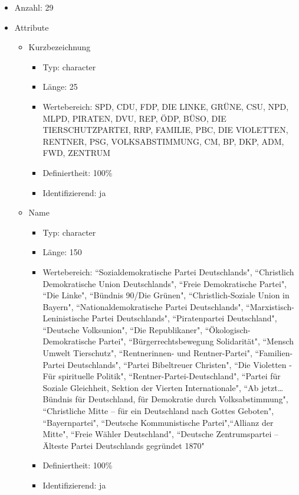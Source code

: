 \documentclass[a4paper]{article}
\begin{document}
\begin{itemize}
\item Anzahl: 29
\item Attribute
	\begin{itemize}
	\item Kurzbezeichnung
	\begin{itemize}
		\item Typ: character
		\item Länge: 25
		\item Wertebereich: SPD, CDU, FDP, DIE LINKE, GRÜNE, CSU, NPD, MLPD, PIRATEN, DVU, REP, ÖDP, BÜSO, DIE TIERSCHUTZPARTEI, RRP, FAMILIE, PBC, DIE VIOLETTEN, RENTNER, PSG, VOLKSABSTIMMUNG, CM, BP, DKP, ADM, FWD, ZENTRUM
		\item Definiertheit: 100\%
		\item Identifizierend: ja
	\end{itemize}
	\item Name
	\begin{itemize}
		\item Typ: character
		\item Länge: 150
		\item Wertebereich: ``Sozialdemokratische Partei Deutschlands", ``Christlich Demokratische Union Deutschlands", ``Freie Demokratische Partei", ``Die Linke", ``Bündnis 90/Die Grünen", ``Christlich-Soziale Union in Bayern", ``Nationaldemokratische Partei Deutschlands", ``Marxistisch-Leninistische Partei Deutschlands", ``Piratenpartei Deutschland", ``Deutsche Volksunion", ``Die Republikaner", ``Ökologisch-Demokratische Partei", ``Bürgerrechtsbewegung Solidarität", ``Mensch Umwelt Tierschutz", ``Rentnerinnen- und Rentner-Partei", ``Familien-Partei Deutschlands", ``Partei Bibeltreuer Christen", ``Die Violetten - Für spirituelle Politik", ``Rentner-Partei-Deutschland", ``Partei für Soziale Gleichheit, Sektion der Vierten Internationale", ``Ab jetzt…Bündnis für Deutschland, für Demokratie durch Volksabstimmung", ``Christliche Mitte – für ein Deutschland nach Gottes Geboten", ``Bayernpartei", ``Deutsche Kommunistische Partei",``Allianz der Mitte", ``Freie Wähler Deutschland", ``Deutsche Zentrumspartei – Älteste Partei Deutschlands gegründet 1870"
		\item Definiertheit: 100\%
		\item Identifizierend: ja
	\end{itemize}
\end{itemize}
\end{itemize}
\end{document}
